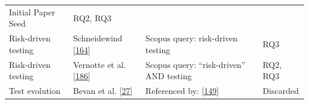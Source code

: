 \documentclass[]{book}
\begin{document}
\begin{longtable}[]{@{}llll@{}}
\begin{minipage}[t]{0.50\columnwidth}
Initial Paper Seed\strut
\end{minipage} & \begin{minipage}[t]{0.04\columnwidth}\raggedright\strut
RQ2, RQ3\strut
\end{minipage}\tabularnewline
\begin{minipage}[t]{0.18\columnwidth}\raggedright\strut
Risk-driven testing\strut
\end{minipage} & \begin{minipage}[t]{0.16\columnwidth}\raggedright\strut
Schneidewind {[}\protect\hyperlink{ref-schneidewind2007}{164}{]}\strut
\end{minipage} & \begin{minipage}[t]{0.50\columnwidth}\raggedright\strut
Scopus query: risk-driven testing\strut
\end{minipage} & \begin{minipage}[t]{0.04\columnwidth}\raggedright\strut
RQ3\strut
\end{minipage}\tabularnewline
\begin{minipage}[t]{0.18\columnwidth}\raggedright\strut
Risk-driven testing\strut
\end{minipage} & \begin{minipage}[t]{0.16\columnwidth}\raggedright\strut
Vernotte et al. {[}\protect\hyperlink{ref-vernotte2015}{186}{]}\strut
\end{minipage} & \begin{minipage}[t]{0.50\columnwidth}\raggedright\strut
Scopus query: ``risk-driven'' AND testing\strut
\end{minipage} & \begin{minipage}[t]{0.04\columnwidth}\raggedright\strut
RQ2, RQ3\strut
\end{minipage}\tabularnewline
\begin{minipage}[t]{0.18\columnwidth}\raggedright\strut
Test evolution\strut
\end{minipage} & \begin{minipage}[t]{0.16\columnwidth}\raggedright\strut
Bevan et al. {[}\protect\hyperlink{ref-bevan2005}{27}{]}\strut
\end{minipage} & \begin{minipage}[t]{0.50\columnwidth}\raggedright\strut
Referenced by:
{[}\protect\hyperlink{ref-pinto2012understanding}{149}{]}\strut
\end{minipage} & \begin{minipage}[t]{0.04\columnwidth}\raggedright\strut
Discarded\strut
\end{minipage}\tabularnewline

\end{longtable}
\end{document}
